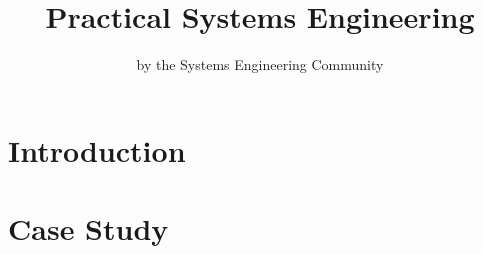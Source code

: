 \documentclass[twoside,10pt]{book}
\title{Practical Systems Engineering}
\author{by the Systems Engineering Community}
\begin{document}
        

\maketitle

\tableofcontents

\chapter{Introduction}


\chapter{Case Study}

\end{document}
